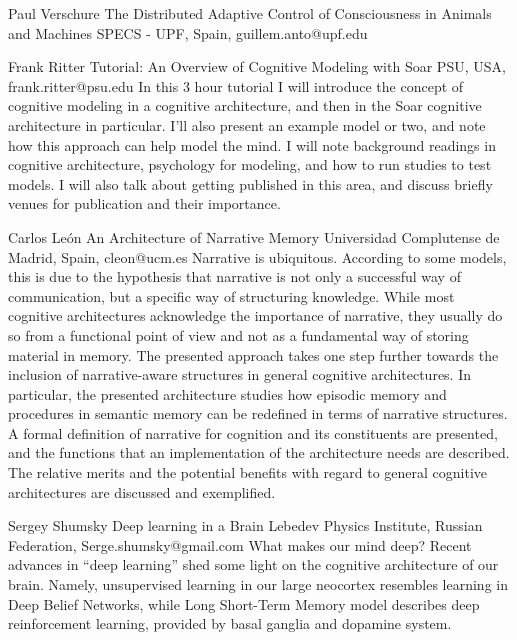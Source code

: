 \documentclass[10pt,fleqn,openany]{book} %
\begin{document}
\begin{enumerate}
	\paperabstract
		{Paul Verschure}
		{The Distributed Adaptive Control of Consciousness in Animals and Machines}
		{SPECS - UPF, Spain, guillem.anto@upf.edu}
		{}

	\paperabstract
		{Frank Ritter}
		{Tutorial: An Overview of Cognitive Modeling with Soar}
		{PSU, USA, frank.ritter@psu.edu}
		{In this 3 hour tutorial I will introduce the concept of cognitive modeling in a cognitive architecture, and then in the Soar cognitive architecture in particular. I'll also present an example model or two, and note how this approach can help model the mind. I will note background readings in cognitive architecture, psychology for modeling, and how to run studies to test models. I will also talk about getting published in this area, and discuss briefly venues for publication and their importance.}
			
	\paperabstract
		{Carlos León}
		{An Architecture of Narrative Memory}
		{Universidad Complutense de Madrid, Spain, cleon@ucm.es}
		{
			Narrative is ubiquitous. According to some models, this is due to the hypothesis that narrative is not only a successful way of communication, but a specific way of structuring knowledge. While most cognitive architectures acknowledge the importance of narrative, they usually do so from a functional point of view and not as a fundamental way of storing material in memory. The presented approach takes one step further towards the inclusion of narrative-aware structures in general cognitive architectures. In particular, the presented architecture studies how episodic memory and procedures in semantic memory can be redefined in terms of narrative structures. A formal definition of narrative for cognition and its constituents are presented, and the functions that an implementation of the architecture needs are described. The relative merits and the potential benefits with regard to general cognitive architectures are discussed and exemplified.}
		
	\paperabstract
		{Sergey Shumsky}
		{Deep learning in a Brain}
		{Lebedev Physics Institute, Russian Federation, Serge.shumsky@gmail.com}
		{
			What makes our mind deep? Recent advances in “deep learning” shed some light on the cognitive architecture of our brain. Namely, unsupervised learning in our large neocortex resembles learning in Deep Belief Networks, while Long Short-Term Memory model describes deep reinforcement learning, provided by basal ganglia and dopamine system.}
		

\end{enumerate}
\end{document}
